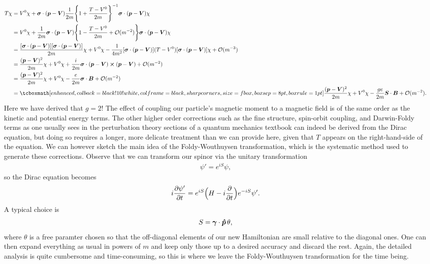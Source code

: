 \begin{align}
    T \chi &= V^{0} \chi + \vb*{\sigma} \cdot (\vb*{p} - \vb*{V}) \frac{1}{2m} \Bigg\{ 1 + \frac{T - V^{0}}{2m} \Bigg\}^{-1} \vb*{\sigma} \cdot (\vb*{p} - \vb*{V}) \chi \nonumber \\
           &= V^{0} \chi + \frac{1}{2m} \vb*{\sigma} \cdot (\vb*{p} - \vb*{V}) \Bigg\{ 1 - \frac{T - V^{0}}{2m} + \mathcal{O}(m^{-2}) \Bigg\} \vb*{\sigma} \cdot (\vb*{p} - \vb*{V}) \chi \nonumber \\
           &= \frac{[\vb*{\sigma} \cdot (\vb*{p} - \vb*{V})] [\vb*{\sigma} \cdot (\vb*{p} - \vb*{V})]}{2m} \chi + V^{0} \chi - \frac{1}{4 m^2} [ \vb*{\sigma} \cdot (\vb*{p} - \vb*{V}) ] (T - V^{0}) [ \vb*{\sigma} \cdot (\vb*{p} - \vb*{V}) ] \chi + \mathcal{O}(m^{-3}) \nonumber \\
           &= \frac{(\vb*{p} - \vb*{V})^2}{2m} \chi + V^{0} \chi + \frac{i}{2m} \vb*{\sigma} \cdot (\vb*{p} - \vb*{V}) \cross (\vb*{p} - \vb*{V}) + \mathcal{O}(m^{-2}) \nonumber \\
           &= \frac{(\vb*{p} - \vb*{V})^2}{2m} \chi + V^{0} \chi - \frac{e}{2m} \vb*{\sigma} \cdot \vb*{B} + \mathcal{O}(m^{-2}) \nonumber \\
           &= \eqbox{ \frac{(\vb*{p} - \vb*{V})^2}{2m} \chi + V^{0} \chi - \frac{g e}{2m} \vb*{S} \cdot \vb*{B} + \mathcal{O}(m^{-2}) }
.\end{align}
Here we have derived that $g = 2$!
The effect of coupling our particle's magnetic moment to a magnetic field is of the same order as the kinetic and potential energy terms.
The other higher order corrections such as the fine structure, spin-orbit coupling, and Darwin-Foldy terms as one usually sees in the perturbation theory sections of a quantum mechanics textbook can indeed be derived from the Dirac equation, but doing so requires a longer, more delicate treatment than we can provide here, given that $T$ appears on the right-hand-side of the equation.
We can however sketch the main idea of the Foldy-Wouthuysen transformation, which is the systematic method used to generate these corrections.
Observe that we can transform our spinor via the unitary transformation
\begin{align}
    \psi' = e^{i S} \psi
,\end{align}
so the Dirac equation becomes
\begin{align}
    i \pdv{\psi'}{t} = e^{i S} \Big( H - i \pdv{t} \Big) e^{-i S} \psi'
.\end{align}
A typical choice is 
\begin{align}
    S = \vb*{\gamma} \cdot \vu*{p} \, \theta
,\end{align}
where $\theta$ is a free paramter chosen so that the off-diagonal elements of our new Hamiltonian are small relative to the diagonal ones.
One can then expand everything as usual in powers of $m$ and keep only those up to a desired accuracy and discard the rest.
Again, the detailed analysis is quite cumbersome and time-consuming, so this is where we leave the Foldy-Wouthuysen transformation for the time being.



